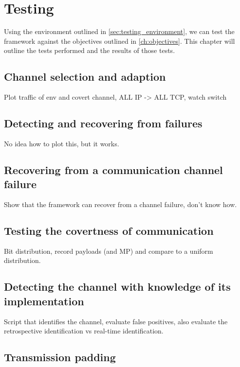 \chapter{Testing}

Using the environment outlined in \ref{sec:testing_environment}, we can test the framework against the objectives outlined in \ref{ch:objectives}.
This chapter will outline the tests performed and the results of those tests.

\section{Channel selection and adaption}
\label{sec:channel_selection_and_adaption}

Plot traffic of env and covert channel, ALL IP -> ALL TCP, watch switch

\section{Detecting and recovering from failures}
\label{sec:detecting_and_recovering_from_failures}

No idea how to plot this, but it works.

\section{Recovering from a communication channel failure}
\label{sec:recovering_from_a_communication_channel_failure}

Show that the framework can recover from a channel failure, don't know how.

\section{Testing the covertness of communication}

Bit distribution, record payloads (and MP) and compare to a uniform distribution.

\section{Detecting the channel with knowledge of its implementation}

Script that identifies the channel, evaluate false positives, also evaluate the retrospective identification vs real-time identification.

\section{Transmission padding}
\label{sec:padding_testing}

